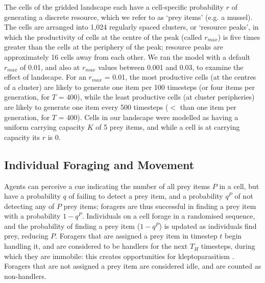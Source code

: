     The cells of the gridded landscape each have a cell-specific probability $r$ of generating a discrete resource, which we refer to as `prey items' (e.g. a mussel).
    The cells are arranged into 1,024 regularly spaced clusters, or `resource peaks', in which the productivity of cells at the centre of the peak (called $r_{max}$) is five times greater than the cells at the periphery of the peak; resource peaks are approximately 16 cells away from each other.
    We ran the model with a default $r_{max}$ of 0.01, and also at $r_{max}$ values between 0.001 and 0.03, to examine the effect of landscape.
    For an $r_{max}$ = 0.01, the most productive cells (at the centres of a cluster) are likely to generate one item per 100 timesteps (or four items per generation, for $T$ = 400), while the least productive cells (at cluster peripheries) are likely to generate one item every 500 timesteps ($<$ than one item per generation, for $T$ = 400).
    Cells in our landscape were modelled as having a uniform carrying capacity $K$ of 5 prey items, and while a cell is at carrying capacity its $r$ is 0.
    
    \subsection*{Individual Foraging and Movement}
    
    Agents can perceive a cue indicating the number of all prey items $P$ in a cell, but have a probability $q$ of failing to detect a prey item, and a probability $q^P$ of not detecting any of $P$ prey items; foragers are thus successful in finding a prey item with a probability $1 - q^P$.
    Individuals on a cell forage in a randomised sequence, and the probability of finding a prey item ($1 - q^P$) is updated as individuals find prey, reducing $P$.
    Foragers that are assigned a prey item in timestep $t$ begin handling it, and are considered to be handlers for the next $T_H$ timesteps, during which they are immobile: this creates opportunities for kleptoparasitism \citep{holmgren1995}.
    Foragers that are not assigned a prey item are considered idle, and are counted as non-handlers.
    
